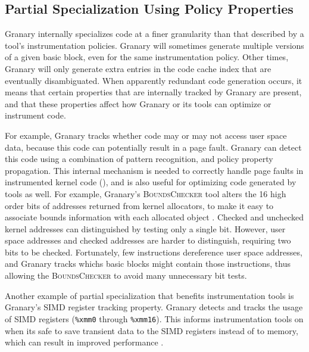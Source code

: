 \documentclass[preprint]{sigplanconf}
\newcommand{\toolname}[1]{{\scshape #1}}
\begin{document}

\subsection{Partial Specialization Using Policy Properties}

Granary internally specializes code at a finer granularity than that described by a tool's instrumentation policies. Granary will sometimes generate multiple versions of a given basic block, even for the same instrumentation policy. Other times, Granary will only generate extra entries in the code cache index that are eventually disambiguated. When apparently redundant code generation occurs, it means that certain properties that are internally tracked by Granary are present, and that these properties affect how Granary or its tools can optimize or instrument code. 

For example, Granary tracks whether code may or may not access user space data, because this code can potentially result in a page fault. Granary can detect this code using a combination of pattern recognition, and policy property propagation. This internal mechanism is needed to correctly handle page faults in instrumented kernel code (), and is also useful for optimizing code generated by tools as well. For example, Granary's \toolname{BoundsChecker} tool alters the 16 high order bits of addresses returned from kernel allocators, to make it easy to associate bounds information with each allocated object \cite{BehaveOrBeWatched}. Checked and unchecked kernel addresses can distinguished by testing only a single bit. However, user space addresses and checked addresses are harder to distinguish, requiring two bits to be checked.  Fortunately,  few instructions dereference user space addresses, and Granary tracks whichs basic blocks might contain those instructions, thus allowing the \toolname{BoundsChecker} to avoid many unnecessary bit tests.

Another example of partial specialization that benefits instrumentation tools is Granary's SIMD register tracking property. Granary detects and tracks the usage of SIMD registers (\texttt{\%xmm0} through \texttt{\%xmm16}). This informs instrumentation tools on when its safe to save transient data to the SIMD registers instead of to memory, which can result in improved performance \cite{Minemu}.
\end{document}
